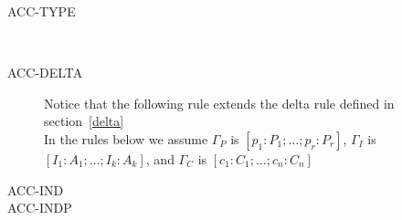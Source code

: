 \begin{description}
\item[ACC-TYPE]
\\
\item[ACC-DELTA]
Notice that the following rule extends the delta rule defined in
section~\ref{delta}
\\
In the rules below we assume $\Gamma_P$ is $[p_1:P_1;\ldots;p_r:P_r]$,
  $\Gamma_I$ is $[I_1:A_1;\ldots;I_k:A_k]$, and $\Gamma_C$ is
  $[c_1:C_1;\ldots;c_n:C_n]$
\item[ACC-IND]
\item[ACC-INDP]

\end{description}






